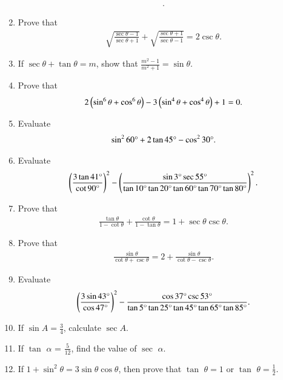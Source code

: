 \begin{enumerate}[label=\thesubsection.\arabic*,ref=\thesubsection.\theenumi,itemsep=1pt]
\begin{align*}
.\end{align*}
\hfill{}\item Prove that 
\begin{align*}
      \sqrt{\frac{\sec\theta-1}{\sec\theta+1}} + \sqrt{\frac{\sec\theta+1}{\sec\theta-1}} = 2\csc\theta
.\end{align*}
\hfill{}\item If $\sec\theta + \tan\theta=m$, show that $\frac{m^2-1}{m^2+1} = \sin\theta$.
\hfill{}\item Prove that 
\begin{align*}
    2 \left(\sin^6\theta +\cos^6\theta\right) - 3 \left(\sin^4\theta + \cos^4\theta\right) + 1 = 0
.\end{align*}
\hfill{}
\item Evaluate 
 \begin{align*}
	     \sin^{2}{60\degree} + 2\tan{45\degree} - \cos^{2}{30\degree}. 
      \end{align*}
\hfill{}\item Evaluate 
\begin{align*}
\left(\frac{3\tan 41\degree}{\cot 90\degree}\right)^2 - \left(\frac{\sin 3\degree \sec 55\degree}{\tan 10\degree \tan 20\degree \tan 60\degree \tan 70\degree \tan 80\degree}\right)^2
.\end{align*}
\hfill{}\item Prove that 
\begin{align*}
\frac{\tan \theta}{1-\cot \theta} + \frac{\cot \theta}{1- \tan \theta} = 1+ \sec \theta  \csc  \theta   
.\end{align*}
\hfill{}\item Prove that 
\begin{align*}
    \frac{\sin \theta}{\cot \theta + \csc \theta} = 2 + \frac{\sin \theta}{\cot \theta - \csc \theta}
.\end{align*}
\hfill{}\item Evaluate 
\begin{align*}
\left(\frac{3\sin 43\degree}{\cos 47\degree}\right)^2 - \frac{\cos 37\degree \csc 53\degree}{\tan 5\degree \tan 25\degree \tan 45\degree \tan 65\degree \tan 85\degree}
.\end{align*}
 \hfill{}\item If $\sin A = \frac{3}{4}$, calculate $\sec A$.
\hfill{}\item If $\tan$ $\alpha$ = ${\frac {5}{12}}$, find the value of $\sec$ $\alpha$.
\hfill{}
\item If $1 + \sin^2 \theta  = 3 \sin \theta \cos \theta$, then prove that $\tan$ $\theta = 1 $ or $\tan$ $\theta = \frac{1}{2}$.

\end{enumerate}
